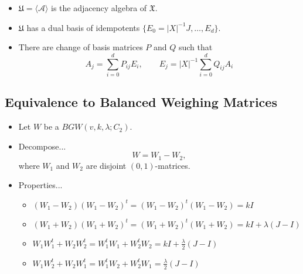\documentclass{beamer}
\newcommand{\abs}[1]{|#1|}
\newcommand{\sharps}[1]{\langle #1 \rangle}
\begin{document}
\begin{frame}

  \begin{itemize}
  \item $\mathfrak{U} = \sharps{\mathscr{A}}$ is the adjacency algebra of
    $\mathfrak{X}$. 
  \item $\mathfrak{U}$ has a dual basis of idempotents $\{E_0=\abs{X}^{-1}J,
    \dots, E_d\}$. 
  \item There are change of basis matrices $P$ and $Q$ such that
    \[
      A_j = \sum_{i=0}^d P_{ij}E_i, \qquad
      E_j = \abs{X}^{-1}\sum_{i=0}^d Q_{ij}A_i
    \]
  \end{itemize}
  
\end{frame}


\subsection{Equivalence to Balanced Weighing Matrices}

\begin{frame}

  \begin{itemize}
  \item Let $W$ be a $BGW(v,k,\lambda; C_2)$.
  \item Decompose...
    \[
      W = W_1 - W_2,
    \]
    where $W_1$ and $W_2$ are disjoint $(0,1)$-matrices.
  \end{itemize}
  
\end{frame}

\begin{frame}

  \begin{itemize}
  \item Properties...
    \begin{itemize}
    \pause\item $(W_1-W_2)(W_1-W_2)^t = (W_1-W_2)^t(W_1-W_2) = kI$
    \pause\item $(W_1+W_2)(W_1+W_2)^t = (W_1+W_2)^t(W_1+W_2) = kI +
      \lambda(J-I)$
    \pause\item $W_1W_1^t + W_2W_2^t = W_1^tW_1 + W_2^tW_2 = kI +
    \frac{\lambda}{2}(J-I)$
    \pause\item $W_1W_2^t + W_2W_1^t = W_1^tW_2 + W_2^tW_1 =
    \frac{\lambda}{2}(J-I)$ 
    \end{itemize}
  \end{itemize}
  
\end{frame}
\end{document}
